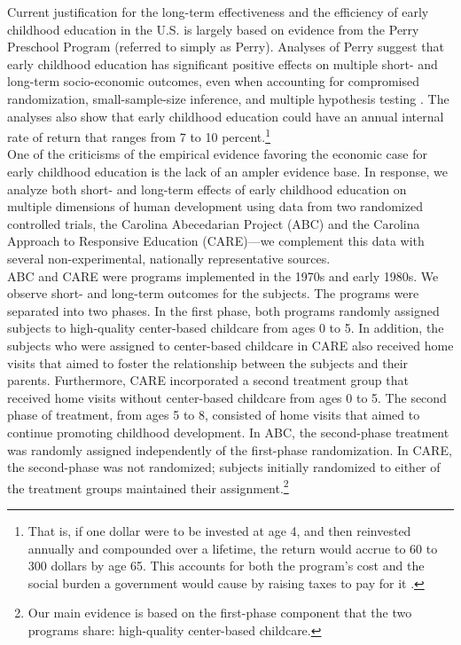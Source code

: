 \noindent  Current justification for the long-term effectiveness and the efficiency of early childhood education in the U.S. is largely based on evidence from the Perry Preschool Program (referred to simply as Perry). Analyses of Perry suggest that early childhood education has significant positive effects on multiple short- and long-term socio-economic outcomes, even when accounting for compromised randomization, small-sample-size inference, and multiple hypothesis testing \citep{Heckman_Moon_etal_2010_QE}. The analyses also show that early childhood education could have an annual internal rate of return that ranges from 7 to 10 percent.\footnote{That is, if one dollar were to be invested at age 4, and then reinvested annually and compounded over a lifetime, the return would accrue to 60 to 300 dollars by age 65. This accounts for both the program's cost and the social burden a government would cause by raising taxes to pay for it \citep{Heckman_Moon_etal_2010_RateofReturn}.}\\

\noindent One of the criticisms of the empirical evidence favoring the economic case for early childhood education is the lack of an ampler evidence base. In response, we analyze both short- and long-term effects of early childhood education on multiple dimensions of human development using data from two randomized controlled trials, the Carolina Abecedarian Project (ABC) and the Carolina Approach to Responsive Education (CARE)---we complement this data with several non-experimental, nationally representative sources.\\

\noindent ABC and CARE were programs implemented in the 1970s and early 1980s. We observe short- and long-term outcomes for the subjects. The programs were separated into two phases. In the first phase, both programs randomly assigned subjects to high-quality center-based childcare from ages 0 to 5. In addition, the subjects who were assigned to center-based childcare in CARE also received home visits that aimed to foster the relationship between the subjects and their parents. Furthermore, CARE incorporated a second treatment group that received home visits without center-based childcare from ages 0 to 5. The second phase of treatment, from ages 5 to 8, consisted of home visits that aimed to continue promoting childhood development. In ABC, the second-phase treatment was randomly assigned independently of the first-phase randomization. In CARE, the second-phase was not randomized; subjects initially randomized to either of the treatment groups maintained their assignment.\footnote{Our main evidence is based on the first-phase component that the two programs share: high-quality center-based childcare.}\\

